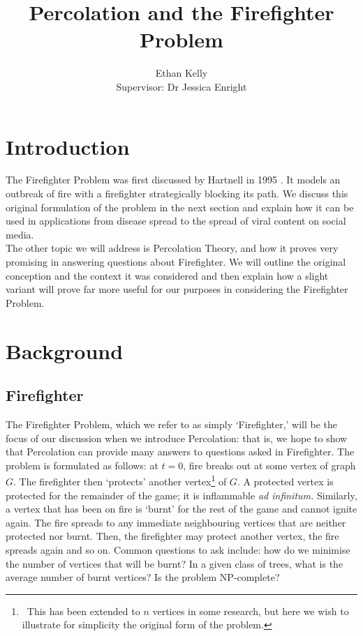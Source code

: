 \documentclass[11pt]{amsart}
\title{Percolation and the Firefighter Problem}
\author{Ethan Kelly\\Supervisor: Dr Jessica Enright}
\begin{document}
\maketitle

\section{Introduction}
\label{sec:intro}

The Firefighter Problem was first discussed by Hartnell in 1995 \cite{hartnell95}. It models an outbreak of fire with a firefighter strategically blocking its path. We discuss this original formulation of the problem in the next section and explain how it can be used in applications from disease spread to the spread of viral content on social media.\\

The other topic we will address is Percolation Theory, and how it proves very promising in answering questions about Firefighter. We will outline the original conception and the context it was considered and then explain how a slight variant will prove far more useful for our purposes in considering the Firefighter Problem.


\section{Background}

\subsection{Firefighter}

The Firefighter Problem, which we refer to as simply `Firefighter,' will be the focus of our discussion when we introduce Percolation: that is, we hope to show that Percolation can provide many answers to questions asked in Firefighter. The problem is formulated as follows: at $t=0$, fire breaks out at some vertex of graph $G$. The firefighter then `protects' another vertex\footnote{\, This has been extended to $n$ vertices in some research, but here we wish to illustrate for simplicity the original form of the problem.} of $G$. A protected vertex is protected for the remainder of the game; it is inflammable \textit{ad infinitum.} Similarly, a vertex that has been on fire is `burnt' for the rest of the game and cannot ignite again. The fire spreads to any immediate neighbouring vertices that are neither protected nor burnt. Then, the firefighter may protect another vertex, the fire spreads again and so on. Common questions to ask include: how do we minimise the number of vertices that will be burnt? In a given class of trees, what is the average number of burnt vertices? Is the problem NP-complete?\\
\end{document}
